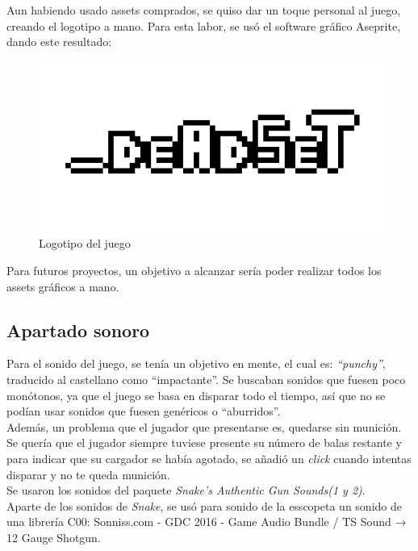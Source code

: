 \documentclass[12pt]{article}
\begin{document}
        Aun habiendo usado assets comprados, se quiso dar un toque personal al juego, creando el logotipo a mano. Para esta labor, se usó el software gráfico Aseprite, dando este resultado:
        \begin{figure}[H]
            \centering
            \includegraphics[width=\textwidth]{Images/logo_big.png}
            \caption{Logotipo del juego}
        \end{figure}
        
        Para futuros proyectos, un objetivo a alcanzar sería poder realizar todos los assets gráficos a mano.
    
    \subsection{Apartado sonoro}
        
        Para el sonido del juego, se tenía un objetivo en mente, el cual es: \textit{“punchy”}, traducido al castellano como “impactante”. Se buscaban sonidos que fuesen poco monótonos, ya que el juego se basa en disparar todo el tiempo, así que no se podían usar sonidos que fuesen genéricos o “aburridos”.\\

        Además, un problema que el jugador que presentarse es, quedarse sin munición. Se quería que el jugador siempre tuviese presente su número de balas restante y para indicar que su cargador se había agotado, se añadió un \textit{click} cuando intentas disparar y no te queda munición.\\
        
        Se usaron los sonidos del paquete \textit{Snake's Authentic Gun Sounds(1 y 2)}.\\
        
        Aparte de los sonidos de \textit{Snake}, se usó para sonido de la esscopeta un sonido de una librería C00: Sonniss.com - GDC 2016 - Game Audio Bundle / TS Sound → 12 Gauge Shotgun.\\
        
\end{document}
